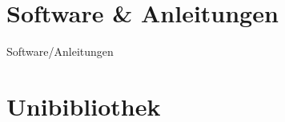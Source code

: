 
\section{Software \& Anleitungen}
\begin{frame}{Software/Anleitungen}
\end{frame}


\section{Unibibliothek}

